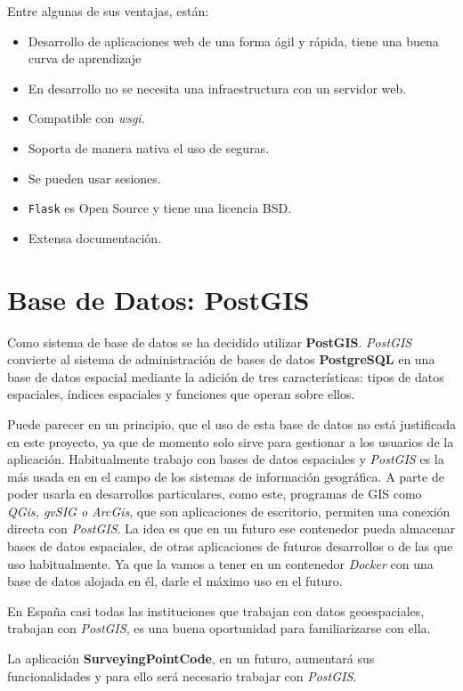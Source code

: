 Entre algunas de sus ventajas, están:
\begin{itemize}
\item Desarrollo de aplicaciones web de una forma ágil y rápida, tiene una buena curva de aprendizaje
\item En desarrollo no se necesita una infraestructura con un servidor web.
\item Compatible con \emph{wsgi}.
\item Soporta de manera nativa el uso de  seguras.
\item Se pueden usar sesiones.
\item \texttt{Flask} es Open Source y tiene una licencia BSD.
\item Extensa documentación.
\end{itemize}

\section{Base de Datos: PostGIS}\label{sec:postgis}

Como sistema de base de datos se ha decidido utilizar \textbf{PostGIS}. \emph{PostGIS} convierte al sistema de administración de bases de datos \textbf{PostgreSQL} en una base de datos espacial mediante la adición de tres características: tipos de datos espaciales, índices espaciales y funciones que operan sobre ellos.

Puede parecer en un principio, que el uso de esta base de datos no está justificada en este proyecto, ya que de momento solo sirve para gestionar a los usuarios de la aplicación. Habitualmente trabajo con bases de datos espaciales y \emph{PostGIS} es la más usada en en el campo de los sistemas de información geográfica. A parte de poder usarla en desarrollos particulares, como este, programas de GIS como \emph{QGis, gvSIG o ArcGis}, que son aplicaciones de escritorio,  permiten una conexión directa con \emph{PostGIS}. 
La idea es que en un futuro ese contenedor pueda almacenar bases de datos espaciales, de otras aplicaciones de futuros desarrollos o de las que uso habitualmente. Ya que la vamos a tener en un contenedor \emph{Docker} con una base de datos alojada en él, darle el máximo uso en el futuro.

En España casi todas las instituciones que trabajan con datos geoespaciales, trabajan con \emph{PostGIS}, es una buena oportunidad para familiarizarse con ella.

La aplicación \textbf{SurveyingPointCode}, en un futuro, aumentará sus funcionalidades y para ello será necesario trabajar con \emph{PostGIS}.

